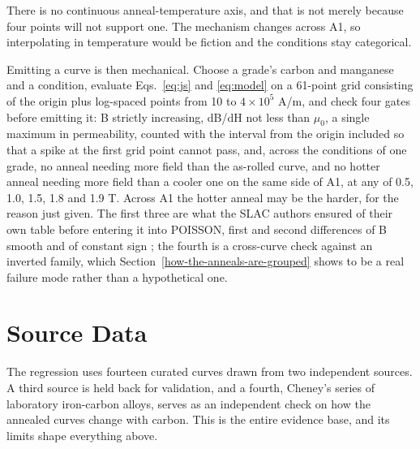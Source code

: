 \documentclass[
  11pt,
]{article}
\begin{document}
There is no continuous anneal-temperature axis, and that is not merely because four points will not support one. The mechanism changes across A1, so interpolating in temperature would be fiction and the conditions stay categorical.

Emitting a curve is then mechanical. Choose a grade's carbon and manganese and a condition, evaluate Eqs.~\eqref{eq:js} and \eqref{eq:model} on a 61-point grid consisting of the origin plus log-spaced points from 10 to \(4\times10^{5}\) A/m, and check four gates before emitting it: B strictly increasing, dB/dH not less than \(\mu_{0}\), a single maximum in permeability, counted with the interval from the origin included so that a spike at the first grid point cannot pass, and, across the conditions of one grade, no anneal needing more field than the as-rolled curve, and no hotter anneal needing more field than a cooler one on the same side of A1, at any of 0.5, 1.0, 1.5, 1.8 and 1.9 T. Across A1 the hotter anneal may be the harder, for the reason just given. The first three are what the SLAC authors ensured of their own table before entering it into POISSON, first and second differences of B smooth and of constant sign \cite{cobb1989}; the fourth is a cross-curve check against an inverted family, which Section~\ref{how-the-anneals-are-grouped} shows to be a real failure mode rather than a hypothetical one.

\section{Source Data}\label{source-data}

The regression uses fourteen curated curves drawn from two independent sources. A third source is held back for validation, and a fourth, Cheney's series of laboratory iron-carbon alloys, serves as an independent check on how the annealed curves change with carbon. This is the entire evidence base, and its limits shape everything above.
\end{document}
